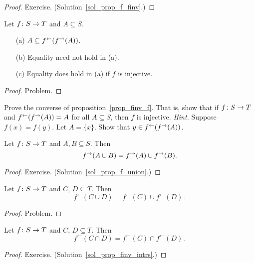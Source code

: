 \begin{proof} Exercise.  (Solution~\ref{sol_prop_f_finv}.) \ns   \end{proof}

\begin{prop}\label{prop_finv_f}  Let $f\colon S \rightarrow T$ and $A \subseteq
S$.
\begin{enumerate}
\item[(a)] $A \subseteq f^{\gets}(f^{\rightarrow}(A))$.
\item[(b)] Equality need not hold in (a).
\item[(c)] Equality does hold in (a) if $f$ is injective.
\end{enumerate}
\end{prop}

\begin{proof} Problem.  \ns  \end{proof}

\begin{prob} Prove the converse of proposition~\ref{prop_finv_f}.  That is, show that if
$f \colon S \rightarrow T$ and $f^{\gets}(f^{\rightarrow}(A)) = A$ for all $A \subseteq S$, then $f$ is
injective. \emph{Hint.}  Suppose $f(x) = f(y)$. Let $A = \{x\}$. Show that $y \in
f^\gets(f^{\rightarrow}(A))$. \ns
\end{prob}

\begin{prop}\label{prop_f_union}  Let $f\colon S \rightarrow T$ and $A,B \subseteq S$. Then
   \[f^{\rightarrow}(A \cup B) = f^{\rightarrow}(A) \cup f^{\rightarrow}(B).\]
\end{prop}

\begin{proof} Exercise. (Solution~\ref{sol_prop_f_union}.) \ns  \end{proof}

\begin{prop}\label{prop_finv_union}  Let $f\colon S \rightarrow T$ and $C$, $D \subseteq T$. Then
   \[ f^{\gets}(C \cup D) = f^{\gets}(C) \cup f^{\gets}(D)\,. \]
\end{prop}

\begin{proof} Problem.  \ns  \end{proof}

\begin{prop}\label{prop_finv_intrs}  Let $f\colon S \rightarrow T$ and $C $, $D \subseteq T$. Then
   \[ f^\gets(C \cap D) = f^\gets(C) \cap f^\gets(D)\,. \]
\end{prop}

\begin{proof} Exercise. (Solution~\ref{sol_prop_finv_intrs}.) \ns  \end{proof}

